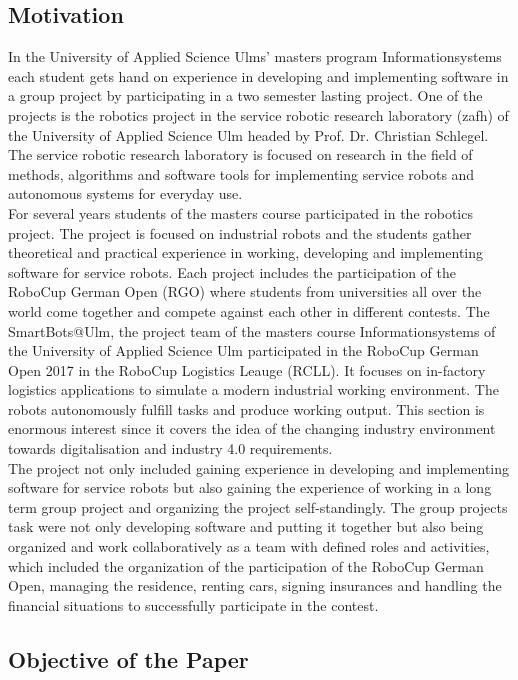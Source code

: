 \subsection{Motivation}

In the University of Applied Science Ulms' masters program Informationsystems each student gets hand on experience in developing and implementing software in a group project by participating in a two semester lasting project. One of the projects is the robotics project in the service robotic research laboratory (zafh) of the University of Applied Science Ulm headed by Prof. Dr. Christian Schlegel. The service robotic research laboratory is focused on research in the field of methods, algorithms and software tools for implementing service robots and autonomous systems for everyday use. \\
For several years students of the masters course participated in the robotics project. The project is focused on industrial robots and the students gather theoretical and practical experience in working, developing and implementing software for service robots. Each project includes the participation of the RoboCup German Open (RGO) where students from universities all over the world come together and compete against each other in different contests. The SmartBots@Ulm, the project team of the masters course Informationsystems of the University of Applied Science Ulm participated in the RoboCup German Open 2017 in the RoboCup Logistics Leauge (RCLL). It focuses on in-factory logistics applications to simulate a modern industrial working environment. The robots autonomously fulfill tasks and produce working output. This section is enormous interest since it covers the idea of the changing industry environment towards digitalisation and industry 4.0 requirements. \\
The project not only included gaining experience in developing and implementing software for service robots but also gaining the experience of working in a long term group project and organizing the project self-standingly. The group projects task were not only developing software and putting it together but also being organized and work collaboratively as a team with defined roles and activities, which included the organization of the participation of the RoboCup German Open, managing the residence, renting cars, signing insurances and handling the financial situations to successfully participate in the contest. 

\subsection{Objective of the Paper}

